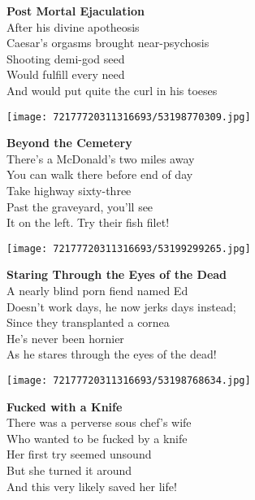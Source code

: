 \documentclass[10pt,letterpaper]{article}
\begin{document}
\begin{center}
\textbf{Post Mortal Ejaculation}\\
\vskip 0.2in
After his divine apotheosis\\
Caesar's orgasms brought near-psychosis\\
Shooting demi-god seed\\
Would fulfill every need\\
And would put quite the curl in his toeses\\
\end{center}
\pagebreak

\begin{center}\texttt{[image: 72177720311316693/53198770309.jpg]}
\end{center}
\begin{center}
\textbf{Beyond the Cemetery}\\
\vskip 0.2in
There's a McDonald's two miles away\\
You can walk there before end of day\\
Take highway sixty-three\\
Past the graveyard, you'll see\\
It on the left.  Try their fish filet!\\
\end{center}
\pagebreak

\begin{center}\texttt{[image: 72177720311316693/53199299265.jpg]}
\end{center}
\begin{center}
\textbf{Staring Through the Eyes of the Dead}\\
\vskip 0.2in
A nearly blind porn fiend named Ed\\
Doesn't work days, he now jerks days instead;\\
Since they transplanted a cornea\\
He's never been hornier\\
As he stares through the eyes of the dead!\\
\end{center}
\pagebreak

\begin{center}\texttt{[image: 72177720311316693/53198768634.jpg]}
\end{center}
\begin{center}
\textbf{Fucked with a Knife}\\
\vskip 0.2in
There was a perverse sous chef's wife\\
Who wanted to be fucked by a knife\\
Her first try seemed unsound\\
But she turned it around\\
And this very likely saved her life!\\
\end{center}
\pagebreak
\end{document}
